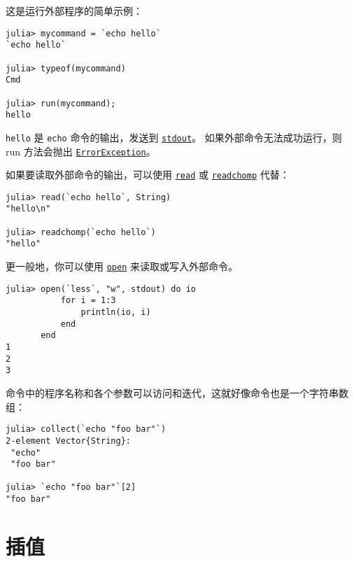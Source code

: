 这是运行外部程序的简单示例：




\begin{verbatim}
julia> mycommand = `echo hello`
`echo hello`

julia> typeof(mycommand)
Cmd

julia> run(mycommand);
hello
\end{verbatim}



\texttt{hello} 是 \texttt{echo} 命令的输出，发送到 \hyperlink{18181294266083891471}{\texttt{stdout}}。 如果外部命令无法成功运行，则 run 方法会抛出 \hyperlink{12102596058483452470}{\texttt{ErrorException}}。



如果要读取外部命令的输出，可以使用 \hyperlink{8104134490906192097}{\texttt{read}} 或 \hyperlink{1622401395685476756}{\texttt{readchomp}} 代替：




\begin{verbatim}
julia> read(`echo hello`, String)
"hello\n"

julia> readchomp(`echo hello`)
"hello"
\end{verbatim}



更一般地，你可以使用 \hyperlink{300818094931158296}{\texttt{open}} 来读取或写入外部命令。




\begin{verbatim}
julia> open(`less`, "w", stdout) do io
           for i = 1:3
               println(io, i)
           end
       end
1
2
3
\end{verbatim}



命令中的程序名称和各个参数可以访问和迭代，这就好像命令也是一个字符串数组：




\begin{verbatim}
julia> collect(`echo "foo bar"`)
2-element Vector{String}:
 "echo"
 "foo bar"

julia> `echo "foo bar"`[2]
"foo bar"
\end{verbatim}



\hypertarget{6373319844820183024}{}


\section{插值}



